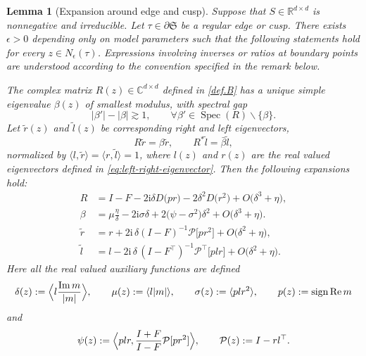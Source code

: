 \documentclass[11pt,twoside, a4paper]{article}
\numberwithin{equation}{section}
\numberwithin{figure}{section}
\theoremstyle{plain} %
\newtheorem{lemma}[theorem]{Lemma}
\theoremstyle{definition}
\theoremstyle{remark}
\newcommand{\1} {\mspace{1 mu}}
\newcommand{\2} {\mspace{2 mu}}
\newcommand{\R} {\mathbb{R}}
\newcommand{\C} {{\mathbb{C}}}
\DeclareMathOperator{\re}{Re}
\DeclareMathOperator{\im}{Im}
\DeclareMathOperator{\sign}{sign}
\DeclareMathOperator{\Spec}{Spec}
\begin{document}
\begin{lemma}[Expansion around edge and cusp]
\label{lem:B-bad-direction-nonsym-local}
Suppose that $S\in \R^{d\times d}$ is nonnegative and irreducible. Let \(\tau\in \partial\mathfrak S\) be a regular edge or cusp. There exists $\epsilon>0$ depending only on model parameters such that the following statements hold for every \(z\in N_\epsilon(\tau)\). Expressions involving inverses or ratios at boundary
points are understood according to the convention specified in the remark below.

The complex matrix $R(z)\in\C^{d\times d}$
defined in \eqref{def.B} has a unique simple eigenvalue $\beta(z)$ of smallest modulus, with spectral gap
\begin{equation}
  |\beta'|-|\beta|\gtrsim 1,\qquad\forall\beta'\in\Spec(R)\backslash\{\beta\}.
\end{equation}
Let \(\tilde r(z)\) and \(\tilde l(z)\) be corresponding right and left eigenvectors,
\[
R\tilde r=\beta\tilde r,\qquad  R^*\tilde l=\bar\beta\tilde l,
\]
normalized by $\langle l,\tilde{r}\rangle=\langle r,\tilde{l}\rangle=1$,
where $l(z)$ and $r(z)$ are the real valued eigenvectors defined in \eqref{eq:left-right-eigenvector}.
Then the following expansions hold:
\begin{align}
R
&=
I-F-2\mathrm i\delta D\bigl(pr\bigr)
-2\delta^2D\bigl(r^2\bigr)
+O\bigl(\delta^3+\eta\bigr),
\label{eq:B-expansion-local}
\\
\beta
&=
\mu\frac{\eta}{\delta}
-2\mathrm i\sigma\delta
+2\bigl(\psi-\sigma^2\bigr)\delta^2
+O\bigl(\delta^3+\eta\bigr).
\label{eq:beta-expansion-local}\\
\tilde r
&=
r+2\mathrm i\,\delta(I-F)^{-1}\mathcal{P}\bigl[pr^2\bigr]
+O\bigl(\delta^2+\eta\bigr),
\label{eq:rtilde-expansion-local}
\\
\tilde l
&=
l-2\mathrm i\,\delta\,(I-F^\top)^{-1}\mathcal{P}^\top\bigl[plr\bigr]
+O\bigl(\delta^2+\eta\bigr).
\label{eq:ltilde-expansion-local}
\end{align}
Here all the real valued auxiliary functions are defined 
\begin{equation}
  \delta(z):=\Bigl\langle l\frac{\im m}{|m|}\Bigr\rangle,\qquad
\mu(z):=\langle l|m|\rangle,\qquad  \sigma(z):=\langle plr^2\rangle,\qquad p(z):=\sign\re m
\end{equation}
and 
\begin{equation}
 \psi(z):=\Bigl\langle plr,\frac{I+F}{I-F}\mathcal{P}[pr^2]\Bigr\rangle,\qquad \mathcal{P}(z):=I-rl^\top.
\end{equation}


\end{lemma}
\end{document}
